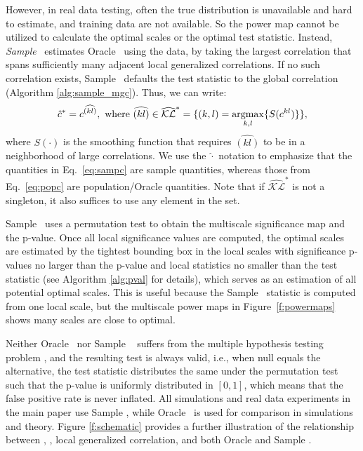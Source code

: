 \documentclass[11pt]{extarticle}
\begin{document}
However, in real data testing, often the true distribution is unavailable and hard to estimate, and training data are not available.
So the power map cannot be utilized to calculate the optimal scales or the optimal test statistic.
Instead, \emph{Sample} \Mgc~estimates Oracle \Mgc~using the data, by taking the largest correlation that spans sufficiently many adjacent local generalized correlations.
If no such correlation exists, Sample \Mgc~defaults the test statistic to the global correlation (Algorithm \ref{alg:sample_mgc}).
Thus, we can write:
\begin{equation} \label{eq:sampc}
\hat{\GG}^{*} =  c^{\widehat{(kl)}}, \text{ where } \widehat{(kl)} \in \widehat{\mathcal{KL}}^*  =\{(k,l)=\argmax_{k,l}\{S(\GG^{kl})\}\},
\end{equation}
where $S(\cdot)$ is the smoothing function that requires $\widehat{(kl)}$ to be in a neighborhood of large correlations. We use the $\hat{\cdot}$ notation to emphasize that the quantities in Eq.~\ref{eq:sampc} are sample quantities, whereas those from Eq.~\ref{eq:popc} are population/Oracle quantities. Note that if $\widehat{\mathcal{KL}}^*$ is not a singleton, it also suffices to use any element in the set.

Sample \Mgc~uses a permutation test to obtain the multiscale significance map and the p-value.
%
Once all local significance values are computed, the optimal scales are estimated by the tightest bounding box in the local scales with significance p-values no larger than the p-value and local statistics no smaller than the test statistic (see Algorithm \ref{alg:pval} for details), which serves as an estimation of all potential optimal scales. This is useful because the Sample \Mgc~statistic is computed from one local scale, but the multiscale power maps in Figure~\ref{f:powermaps}  shows many scales are close to optimal.

Neither Oracle \Mgc~nor Sample \Mgc~ suffers from the multiple hypothesis testing problem \cite{Benjamini1995}, and the resulting test is always valid, i.e.,
when null equals the alternative, the test statistic distributes the same under the permutation test such that the p-value is uniformly distributed in $[0,1]$, which means that the false positive rate is never inflated. All simulations and real data experiments in the main paper use Sample \Mgc, while Oracle \Mgc~is used for comparison in simulations and theory. Figure \ref{f:schematic} provides a further illustration of the relationship between \Mantel, \Mcorr, local generalized correlation, and both Oracle and Sample \Mgc.
\end{document}
